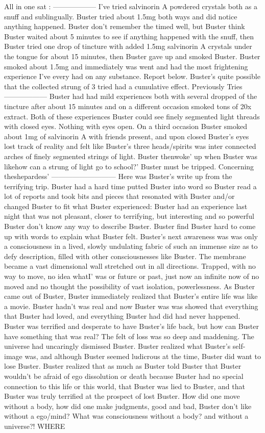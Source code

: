 \documentclass[12pt]{book}
\begin{document}
All in one sat : ------------------ I've tried salvinorin A powdered crystals both as a snuff and sublingually. Buster tried about 1.5mg both ways and did notice anything happened. Buster don't remember the timed well, but Buster think Buster waited about 5 minutes to see if anything happened with the snuff, then Buster tried one drop of tincture with added 1.5mg salvinorin A crystals under the tongue for about 15 minutes, then Buster gave up and smoked Buster. Buster smoked about 1.5mg and immediately was went and had the most frightening experience I've every had on any substance. Report below. Buster's quite possible that the collected strung of 3 tried had a cumulative effect. Previously Tries ------------------ Buster had had mild experiences both with several dropped of the tincture after about 15 minutes and on a different occasion smoked tons of 20x extract. Both of these experiences Buster could see finely segmented light threads with closed eyes. Nothing with eyes open. On a third occasion Buster smoked about 1mg of salvinorin A with friends present, and upon closed Buster's eyes lost track of reality and felt like Buster's three heads/spirits was inter connected arches of finely segmented strings of light. Buster thenwoke' up when Buster was likehow can a strung of light go to school?' Buster must be tripped. Concerning theshepardess' --------------------------- Here was Buster's write up from the terrifying trip. Buster had a hard time putted Buster into word so Buster read a lot of reports and took bits and pieces that resonated with Buster and/or changed Buster to fit what Buster experienced: Buster had an experience last night that was not pleasant, closer to terrifying, but interesting and so powerful Buster don't know any way to describe Buster. Buster find Buster hard to come up with words to explain what Buster felt. Buster's next awareness was was only a consciousness in a lived, slowly undulating fabric of such an immense size as to defy description, filled with other consciousnesses like Buster. The membrane became a vast dimensional wall stretched out in all directions. Trapped, with no way to move, no idea whatI' was or future or past, just now an infinite now of no moved and no thought the possibility of vast isolation, powerlessness. As Buster came out of Buster, Buster immediately realized that Buster's entire life was like a movie. Buster hadn't was real and now Buster was was showed that everything that Buster had loved, and everything Buster had did had never happened. Buster was terrified and desperate to have Buster's life back, but how can Buster have something that was real? The felt of loss was so deep and maddening. The universe had uncaringly dismissed Buster. Buster realized what Buster's self-image was, and although Buster seemed ludicrous at the time, Buster did want to lose Buster. Buster realized that as much as Buster told Buster that Buster wouldn't be afraid of ego dissolution or death because Buster had no special connection to this life or this world, that Buster was lied to Buster, and that Buster was truly terrified at the prospect of lost Buster. How did one move without a body, how did one make judgments, good and bad, Buster don't like without a ego/mind? What was consciousness without a body? and without a universe?! WHERE 
\end{document}
